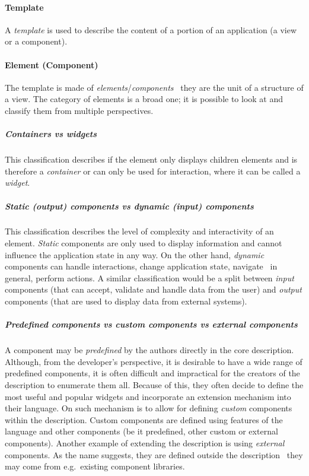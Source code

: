 \paragraph{Template}
A \emph{template} is used to describe the content of a portion of an application (a view or a component).

\paragraph{Element (Component)}
The template is made of \emph{elements}/\emph{components} \textendash\ they are the unit of a structure of a view.
The category of elements is a broad one;
it is possible to look at and classify them from multiple perspectives.

\subparagraph{Containers vs widgets}
This classification describes if the element only displays children elements and is therefore a \emph{container} or can only be used for interaction, where it can be called a \emph{widget}.

\subparagraph{Static (output) components vs dynamic (input) components}
This classification describes the level of complexity and interactivity of an element.
\emph{Static} components are only used to display information and cannot influence the application state in any way.
On the other hand, \emph{dynamic} components can handle interactions, change application state, navigate \textendash\ in general, perform actions.
A similar classification would be a split between \emph{input} components (that can accept, validate and handle data from the user) and \emph{output} components (that are used to display data from external systems).

\subparagraph{Predefined components vs custom components vs external components}
A component may be \emph{predefined} by the authors directly in the core description.
Although, from the developer's perspective, it is desirable to have a wide range of predefined components, it is often difficult and impractical for the creators of the description to enumerate them all.
Because of this, they often decide to define the most useful and popular widgets and incorporate an extension mechanism into their language.
On such mechanism is to allow for defining \emph{custom} components within the description.
Custom components are defined using features of the language and other components (be it predefined, other custom or external components).
Another example of extending the description is using \emph{external} components.
As the name suggests, they are defined outside the description \textendash\ they may come from e.g.\ existing component libraries.

